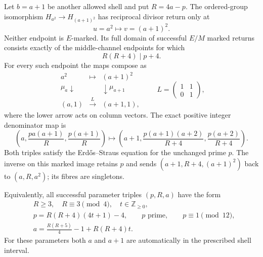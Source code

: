 \begin{theorem}
\label{thm:connes-marked-successor}
Let $b=a+1$ be another allowed shell and put $R=4a-p$.
The ordered-group isomorphism $H_{a^2}\to H_{(a+1)^2}$ has reciprocal
divisor return only at
\[
 u=a^2\longmapsto v=(a+1)^2.
\]
Neither endpoint is $E$-marked.  Its full domain of successful $E/M$
marked returns consists exactly of the middle-channel endpoints for
which
\[
 R(R+4)\mid p+4.
\]
For every such endpoint the maps compose as
\[
 \begin{array}{ccc}
 a^2&\longmapsto&(a+1)^2\\
 \mu_a\downarrow&&\downarrow\mu_{a+1}\\
 (a,1)&\xrightarrow{\ L\ }&(a+1,1),
 \end{array}
 \qquad
 L=\begin{pmatrix}1&1\\0&1\end{pmatrix},
\]
where the lower arrow acts on column vectors.
The exact positive integer denominator map is
\[
 \left(a,\frac{pa(a+1)}R,\frac{p(a+1)}R\right)
 \longmapsto
 \left(a+1,\frac{p(a+1)(a+2)}{R+4},\frac{p(a+2)}{R+4}\right).
\]
Both triples satisfy the Erd\H{o}s--Straus equation for the unchanged
prime $p$.  The inverse on this marked image retains $p$ and sends
$(a+1,R+4,(a+1)^2)$ back to $(a,R,a^2)$; its fibres are singletons.

Equivalently, all successful parameter triples $(p,R,a)$ have the form
\[
 \begin{split}
 &R\ge3,\quad R\equiv3\pmod4,\quad t\in\mathbb Z_{\ge0},\\
 &p=R(R+4)(4t+1)-4,\qquad p\text{ prime},\qquad p\equiv1\pmod{12},\\
 &a=\frac{R(R+5)}4-1+R(R+4)t.
 \end{split}
\]
For these parameters both $a$ and $a+1$ are automatically in the
prescribed shell interval.
\end{theorem}
